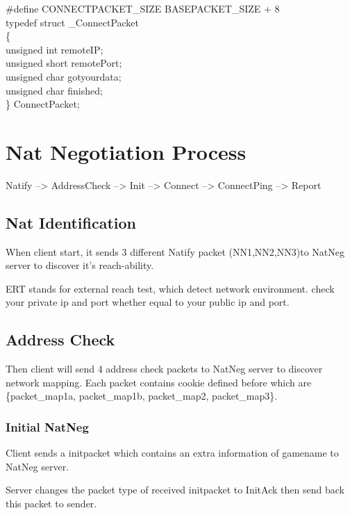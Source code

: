 \documentclass[oneside,titlepage,a4paper]{Definition/retrospy} %
\begin{document}
\begin{mybox}
	\#define CONNECTPACKET\_SIZE BASEPACKET\_SIZE + 8\\
	typedef struct \_ConnectPacket\\
	\{\\
	unsigned int remoteIP;\\
	unsigned short remotePort;\\
	unsigned char gotyourdata;\\
	unsigned char finished;\\
	\} ConnectPacket;\\
\end{mybox}

\section{Nat Negotiation Process}

Natify --> AddressCheck --> Init --> Connect --> ConnectPing --> Report



\subsection{Nat Identification}

When client start, it sends 3 different Natify packet (NN1,NN2,NN3)to NatNeg server to discover it's reach-ability.

ERT stands for external reach test, which detect network environment. check your private ip and port whether equal to your public ip and port.
\subsection{Address Check}
Then client will send 4 address check packets to NatNeg server to discover network mapping. Each packet contains cookie defined before which are \{packet\_map1a, packet\_map1b, packet\_map2, packet\_map3\}.

\subsubsection{Initial NatNeg}

\ClientRequest
Client sends a initpacket which contains an extra information of gamename to NatNeg server.

\ServerResponse
Server changes the packet type of received initpacket to InitAck then send back this packet to sender.
\end{document}
